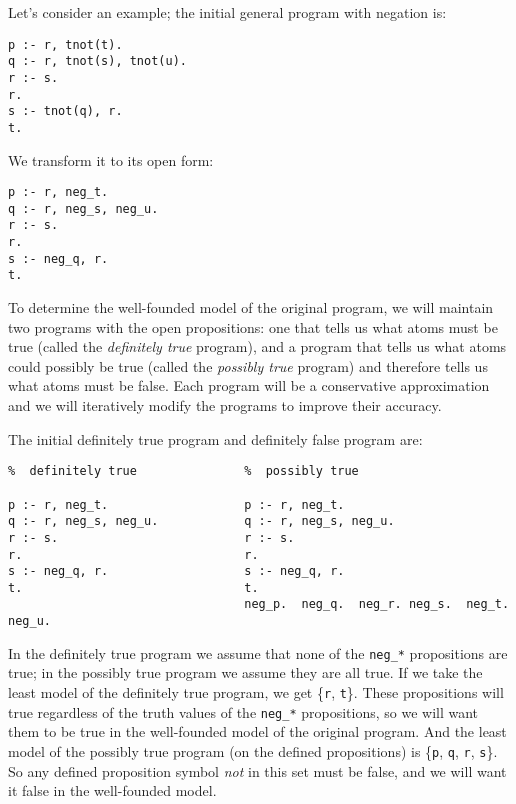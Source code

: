 Let's consider an example; the initial general program with negation
is:
\begin{verbatim}
p :- r, tnot(t).
q :- r, tnot(s), tnot(u).
r :- s.
r.
s :- tnot(q), r.
t.
\end{verbatim}
We transform it to its open form:
\begin{verbatim}
p :- r, neg_t.
q :- r, neg_s, neg_u.
r :- s.
r.
s :- neg_q, r.
t.
\end{verbatim}
To determine the well-founded model of the original program, we will
maintain two programs with the open propositions: one that tells us
what atoms must be true (called the {\em definitely true} program),
and a program that tells us what atoms could possibly be true (called
the {\em possibly true} program) and therefore tells us what atoms
must be false.  Each program will be a conservative approximation and
we will iteratively modify the programs to improve their accuracy.

The initial definitely true program and definitely false program are:
\begin{verbatim}
%  definitely true               %  possibly true

p :- r, neg_t.                   p :- r, neg_t.
q :- r, neg_s, neg_u.            q :- r, neg_s, neg_u.
r :- s.                          r :- s.
r.                               r.
s :- neg_q, r.                   s :- neg_q, r.
t.                               t.
                                 neg_p.  neg_q.  neg_r. neg_s.  neg_t.  neg_u.
\end{verbatim}
In the definitely true program we assume that none of the \verb|neg_*|
propositions are true; in the possibly true program we assume they are
all true.  If we take the least model of the definitely true program,
we get \{\verb|r|, \verb|t|\}.  These propositions will true
regardless of the truth values of the \verb|neg_*| propositions, so we
will want them to be true in the well-founded model of the original
program.  And the least model of the possibly true program (on the
defined propositions) is \{\verb|p|, \verb|q|, \verb|r|, \verb|s|\}.
So any defined proposition symbol {\em not} in this set must be false,
and we will want it false in the well-founded model.

